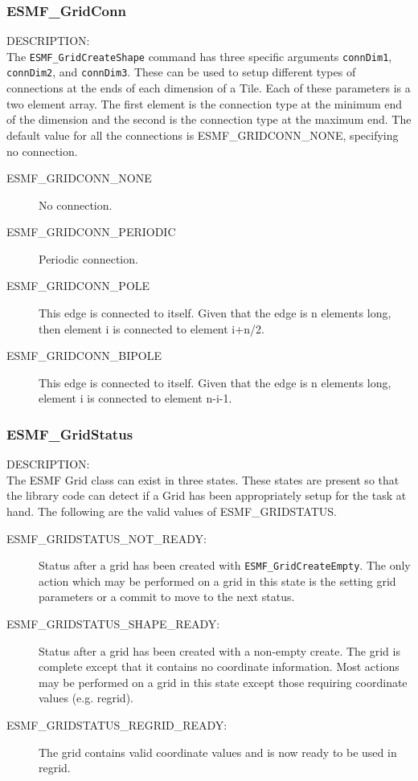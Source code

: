 
\subsubsection{ESMF\_GridConn}\label{sec:opt:gridconn}
{\sf DESCRIPTION:\\}
The {\tt ESMF\_GridCreateShape} command has three specific arguments
{\tt connDim1}, {\tt connDim2}, and {\tt connDim3}. These can be used
to setup different types of connections at the ends of each dimension
of a Tile.  Each of these parameters is a two element array. The first
element is the connection type at the minimum end of the dimension
and the second is the connection type at the maximum end. The default
value for all the connections is ESMF\_GRIDCONN\_NONE, specifying no
connection.

\medskip
\begin{description}
\item [ESMF\_GRIDCONN\_NONE] No connection.

\item [ESMF\_GRIDCONN\_PERIODIC] Periodic connection.

\item [ESMF\_GRIDCONN\_POLE] This edge is connected to itself. Given that the edge
is n elements long, then element i is connected to element i+n/2.

\item [ESMF\_GRIDCONN\_BIPOLE] This edge is connected to itself. Given that the edge
is n elements long, element i is connected to element n-i-1.

\end{description}

\subsubsection{ESMF\_GridStatus}\label{sec:opt:gridstatus}

 {\sf DESCRIPTION:\\}
The ESMF Grid class can exist in three states. These states are
present so that the library code can detect if a Grid has been
appropriately setup for the task at hand. The following
are the valid values of ESMF\_GRIDSTATUS.

\medskip
\begin{description}
\item [ESMF\_GRIDSTATUS\_NOT\_READY:] Status after a grid has been created with 
      {\tt ESMF\_GridCreateEmpty}. The only action which may be performed on a
      grid in this state is the setting grid parameters or a commit to move 
      to the next status. 
\item [ESMF\_GRIDSTATUS\_SHAPE\_READY:] Status after a grid has been created with 
      a non-empty create. The grid is complete except that it contains no coordinate
      information. Most actions may be performed on a grid in this state
      except those requiring coordinate values (e.g. regrid).
\item [ESMF\_GRIDSTATUS\_REGRID\_READY:] The grid contains valid coordinate
      values and is now ready to be used in regrid. 
\end{description}


